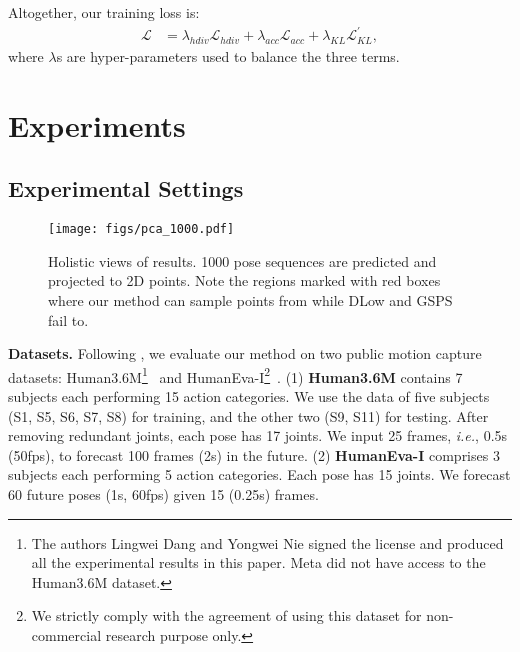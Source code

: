 \documentclass[sigconf,screen,nonacm]{acmart}
\begin{document}
	Altogether, our training loss is:
	\begin{equation}
		\begin{aligned}
			\mathcal{L} &= \lambda_{hdiv} \mathcal{L}_{hdiv} + \lambda_{acc} \mathcal{L}_{acc} + \lambda_{KL} \mathcal{L}^\prime_{KL},
		\end{aligned}
		\label{equ:all_loss_one_stream}
	\end{equation}
	where $\lambda$s are hyper-parameters used to balance the three terms.
	
	\section{Experiments}




	\subsection{Experimental Settings}
	
	\begin{figure*}[!t]
		\centering
		\texttt{[image: figs/pca\_1000.pdf]}
		\caption{Holistic views of results. 1000 pose sequences are predicted and projected to 2D points. Note the regions marked with red boxes where our method can sample points from while DLow and GSPS fail to.}
		\label{fig:pca_diversity}
	\end{figure*}
	
\textbf{Datasets.} Following \cite{yuan2020dlow, mao2021generating}, we evaluate our method on two public motion capture datasets: Human3.6M\footnote{The authors Lingwei Dang and Yongwei Nie signed the license and produced all the experimental results in this paper. Meta did not have access to the Human3.6M dataset.}~\cite{ionescu2013human3} and HumanEva-I\footnote{We strictly comply with the agreement of using this dataset for non-commercial research purpose only.}~\cite{sigal2010humaneva}. (1) \textbf{Human3.6M} contains 7 subjects each performing 15 action categories. We use the data of five subjects (S1, S5, S6, S7, S8) for training, and the other two (S9, S11) for testing. After removing redundant joints, each pose has 17 joints. We input 25 frames, \textit{i.e.}, 0.5s (50fps), to forecast 100 frames (2s) in the future. (2) \textbf{HumanEva-I} comprises 3 subjects each performing 5 action categories. Each pose has 15 joints. We forecast 60 future poses (1s, 60fps) given 15 (0.25s) frames. 
\end{document}
